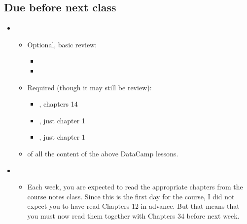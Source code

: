 \documentclass[letterpaper,10pt,english]{jupyterBook}
\begin{document}
\subsection{Due before next class}
\label{\detokenize{course-schedule:due-before-next-class}}\begin{itemize}
\item {} 
\sphinxAtStartPar
{}
\begin{itemize}
\item {} 
\sphinxAtStartPar
Optional, basic review:
\begin{itemize}
\item {} 
\sphinxAtStartPar
{}

\item {} 
\sphinxAtStartPar
{}

\end{itemize}

\item {} 
\sphinxAtStartPar
Required (though it may still be review):
\begin{itemize}
\item {} 
\sphinxAtStartPar
{}, chapters 1\sphinxhyphen{}4

\item {} 
\sphinxAtStartPar
{}, just chapter 1

\item {} 
\sphinxAtStartPar
{}, just chapter 1

\end{itemize}

\item {} 
\sphinxAtStartPar
{} of all the content of the above DataCamp lessons.

\end{itemize}

\item {} 
\sphinxAtStartPar
{}
\begin{itemize}
\item {} 
\sphinxAtStartPar
Each week, you are expected to read the appropriate chapters from the course notes  class.  Since this is the first day for the course, I did not expect you to have read Chapters 1\sphinxhyphen{}2 in advance.  But that means that you must now read them together with Chapters 3\sphinxhyphen{}4 before next week.


\end{itemize}
\end{itemize}
\end{document}
